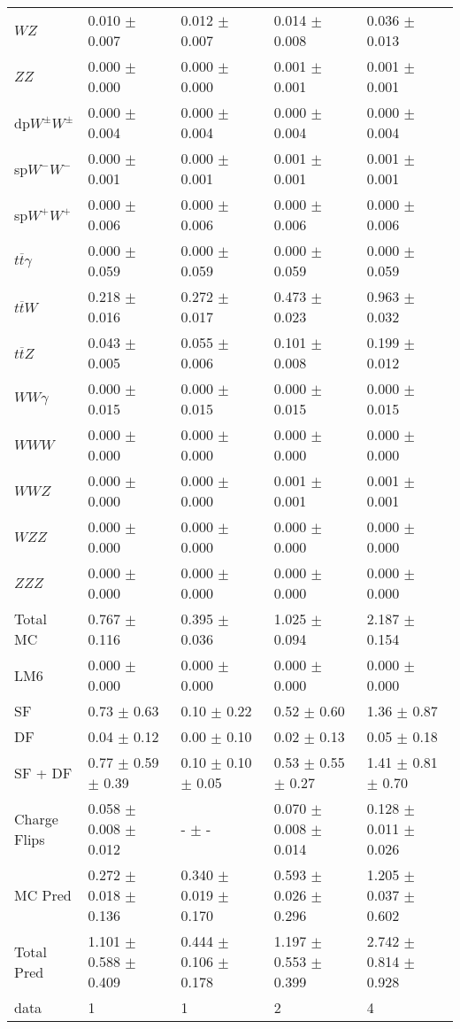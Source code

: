 \begin{tabular}{l | l l l l}
$WZ$ &  0.010 $\pm$  0.007 &  0.012 $\pm$  0.007 &  0.014 $\pm$  0.008 &  0.036 $\pm$  0.013\\
$ZZ$ &   0.000 $\pm$   0.000 &  0.000 $\pm$   0.000 &  0.001 $\pm$  0.001 &  0.001 $\pm$  0.001\\
\hline
dp$W^{\pm}W^{\pm}$ &  0.000 $\pm$  0.004 &  0.000 $\pm$  0.004 &  0.000 $\pm$  0.004 &  0.000 $\pm$  0.004\\
sp$W^{-}W^{-}$ &  0.000 $\pm$  0.001 &  0.000 $\pm$  0.001 &  0.001 $\pm$  0.001 &  0.001 $\pm$  0.001\\
sp$W^{+}W^{+}$ &  0.000 $\pm$  0.006 &  0.000 $\pm$  0.006 &  0.000 $\pm$  0.006 &  0.000 $\pm$  0.006\\
$t\overline{t}\gamma$ &  0.000 $\pm$  0.059 &  0.000 $\pm$  0.059 &  0.000 $\pm$  0.059 &  0.000 $\pm$  0.059\\
$t\overline{t}W$ &  0.218 $\pm$  0.016 &  0.272 $\pm$  0.017 &  0.473 $\pm$  0.023 &  0.963 $\pm$  0.032\\
$t\overline{t}Z$ &  0.043 $\pm$  0.005 &  0.055 $\pm$  0.006 &  0.101 $\pm$  0.008 &  0.199 $\pm$  0.012\\
$WW\gamma$ &  0.000 $\pm$  0.015 &  0.000 $\pm$  0.015 &  0.000 $\pm$  0.015 &  0.000 $\pm$  0.015\\
$WWW$ &   0.000 $\pm$   0.000 &   0.000 $\pm$   0.000 &   0.000 $\pm$   0.000 &   0.000 $\pm$   0.000\\
$WWZ$ &  0.000 $\pm$   0.000 &  0.000 $\pm$   0.000 &  0.001 $\pm$  0.001 &  0.001 $\pm$  0.001\\
$WZZ$ &   0.000 $\pm$   0.000 &   0.000 $\pm$   0.000 &  0.000 $\pm$   0.000 &   0.000 $\pm$   0.000\\
$ZZZ$ &   0.000 $\pm$   0.000 &   0.000 $\pm$   0.000 &   0.000 $\pm$   0.000 &   0.000 $\pm$   0.000\\
\hline
Total MC &  0.767 $\pm$  0.116 &  0.395 $\pm$  0.036 &  1.025 $\pm$  0.094 &  2.187 $\pm$  0.154\\
\hline\hline
\hline
LM6 &  0.000 $\pm$  0.000 &  0.000 $\pm$  0.000 &  0.000 $\pm$  0.000 &  0.000 $\pm$  0.000\\
\hline\hline
\hline\hline
 SF  & 0.73 $\pm$ 0.63 & 0.10 $\pm$ 0.22 & 0.52 $\pm$ 0.60 & 1.36 $\pm$ 0.87\\
 DF  & 0.04 $\pm$ 0.12 & 0.00 $\pm$ 0.10 & 0.02 $\pm$ 0.13 & 0.05 $\pm$ 0.18\\
\hline
 SF + DF  & 0.77 $\pm$ 0.59 $\pm$ 0.39 & 0.10 $\pm$ 0.10 $\pm$ 0.05 & 0.53 $\pm$ 0.55 $\pm$ 0.27 & 1.41 $\pm$ 0.81 $\pm$ 0.70\\
\hline\hline
Charge Flips & 0.058 $\pm$ 0.008 $\pm$ 0.012 & - $\pm$ - & 0.070 $\pm$ 0.008 $\pm$ 0.014 & 0.128 $\pm$ 0.011 $\pm$ 0.026\\
\hline\hline
\hline
MC Pred &  0.272 $\pm$  0.018 $\pm$  0.136 &  0.340 $\pm$  0.019 $\pm$  0.170 &  0.593 $\pm$  0.026 $\pm$  0.296 &  1.205 $\pm$  0.037 $\pm$  0.602\\
\hline\hline
Total Pred &  1.101 $\pm$  0.588 $\pm$  0.409 &  0.444 $\pm$  0.106 $\pm$  0.178 &  1.197 $\pm$  0.553 $\pm$  0.399 &  2.742 $\pm$  0.814 $\pm$  0.928\\
\hline\hline
data & 1 & 1 & 2 & 4\\
\hline\hline
\end{tabular}
